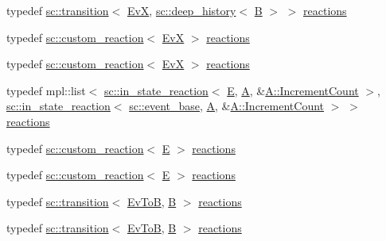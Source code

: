\begin{DoxyCompactItemize}
\item 
typedef \mbox{\hyperlink{classboost_1_1statechart_1_1transition}{sc\+::transition}}$<$ \mbox{\hyperlink{struct_ev_x}{EvX}}, \mbox{\hyperlink{classboost_1_1statechart_1_1deep__history}{sc\+::deep\+\_\+history}}$<$ \mbox{\hyperlink{struct_b}{B}} $>$ $>$ \mbox{\hyperlink{struct_a_a336e15662d0cfb81d1abb41df9fca187}{reactions}}
\item 
typedef \mbox{\hyperlink{classboost_1_1statechart_1_1custom__reaction}{sc\+::custom\+\_\+reaction}}$<$ \mbox{\hyperlink{struct_ev_x}{EvX}} $>$ \mbox{\hyperlink{struct_a_aca29ac82093be1c88d8177f5108af763}{reactions}}
\item 
typedef \mbox{\hyperlink{classboost_1_1statechart_1_1custom__reaction}{sc\+::custom\+\_\+reaction}}$<$ \mbox{\hyperlink{struct_ev_x}{EvX}} $>$ \mbox{\hyperlink{struct_a_aca29ac82093be1c88d8177f5108af763}{reactions}}
\item 
typedef mpl\+::list$<$ \mbox{\hyperlink{classboost_1_1statechart_1_1in__state__reaction}{sc\+::in\+\_\+state\+\_\+reaction}}$<$ \mbox{\hyperlink{struct_e}{E}}, \mbox{\hyperlink{struct_a}{A}}, \&\mbox{\hyperlink{struct_a_a7811ed8883449fde0d5f59bd2ebf3de5}{A\+::\+Increment\+Count}} $>$, \mbox{\hyperlink{classboost_1_1statechart_1_1in__state__reaction}{sc\+::in\+\_\+state\+\_\+reaction}}$<$ \mbox{\hyperlink{classboost_1_1statechart_1_1event__base}{sc\+::event\+\_\+base}}, \mbox{\hyperlink{struct_a}{A}}, \&\mbox{\hyperlink{struct_a_a7811ed8883449fde0d5f59bd2ebf3de5}{A\+::\+Increment\+Count}} $>$ $>$ \mbox{\hyperlink{struct_a_a34d11f67d397f777186858587949c5a2}{reactions}}
\item 
typedef \mbox{\hyperlink{classboost_1_1statechart_1_1custom__reaction}{sc\+::custom\+\_\+reaction}}$<$ \mbox{\hyperlink{struct_e}{E}} $>$ \mbox{\hyperlink{struct_a_a34ec5dc41104a605ae13eff9a6a97a39}{reactions}}
\item 
typedef \mbox{\hyperlink{classboost_1_1statechart_1_1custom__reaction}{sc\+::custom\+\_\+reaction}}$<$ \mbox{\hyperlink{struct_e}{E}} $>$ \mbox{\hyperlink{struct_a_a34ec5dc41104a605ae13eff9a6a97a39}{reactions}}
\item 
typedef \mbox{\hyperlink{classboost_1_1statechart_1_1transition}{sc\+::transition}}$<$ \mbox{\hyperlink{struct_ev_to_b}{Ev\+ToB}}, \mbox{\hyperlink{struct_b}{B}} $>$ \mbox{\hyperlink{struct_a_a14567593462fe87eb5c35b1c564dc869}{reactions}}
\item 
typedef \mbox{\hyperlink{classboost_1_1statechart_1_1transition}{sc\+::transition}}$<$ \mbox{\hyperlink{struct_ev_to_b}{Ev\+ToB}}, \mbox{\hyperlink{struct_b}{B}} $>$ \mbox{\hyperlink{struct_a_a14567593462fe87eb5c35b1c564dc869}{reactions}}

\end{DoxyCompactItemize}

